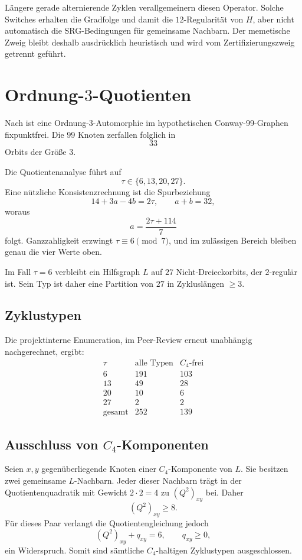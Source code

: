 \documentclass[11pt,a4paper]{article}
\begin{document}
Längere gerade alternierende Zyklen verallgemeinern diesen Operator. Solche Switches erhalten die Gradfolge und damit die $12$-Regularität von $H$, aber nicht automatisch die SRG-Bedingungen für gemeinsame Nachbarn. Der memetische Zweig bleibt deshalb ausdrücklich heuristisch und wird vom Zertifizierungszweig getrennt geführt.

\section{Ordnung-$3$-Quotienten}

Nach \cite{BehbahaniLam2011,CrnkovicMaksimovic2020} ist eine Ordnung-$3$-Automorphie im hypothetischen Conway-99-Graphen fixpunktfrei. Die $99$ Knoten zerfallen folglich in
\[
33
\]
Orbits der Größe $3$.

Die Quotientenanalyse führt auf
\[
\boxed{\tau\in\{6,13,20,27\}.}
\]
Eine nützliche Konsistenzrechnung ist die Spurbeziehung
\[
14+3a-4b=2\tau,\qquad a+b=32,
\]
woraus
\[
a=\frac{2\tau+114}{7}
\]
folgt. Ganzzahligkeit erzwingt $\tau\equiv6\pmod 7$, und im zulässigen Bereich bleiben genau die vier Werte oben.

Im Fall $\tau=6$ verbleibt ein Hilfsgraph $L$ auf $27$ Nicht-Dreieckorbits, der $2$-regulär ist. Sein Typ ist daher eine Partition von $27$ in Zykluslängen $\ge3$.

\subsection{Zyklustypen}

Die projektinterne Enumeration, im Peer-Review erneut unabhängig nachgerechnet, ergibt:
\[
\begin{array}{c|r|r}
\tau & \text{alle Typen} & \text{$C_4$-frei}\\
\hline
6  & 191 & 103\\
13 & 49  & 28\\
20 & 10  & 6\\
27 & 2   & 2\\
\hline
\text{gesamt} & 252 & 139
\end{array}
\]

\subsection{Ausschluss von $C_4$-Komponenten}

Seien $x,y$ gegenüberliegende Knoten einer $C_4$-Komponente von $L$. Sie besitzen zwei gemeinsame $L$-Nachbarn. Jeder dieser Nachbarn trägt in der Quotientenquadratik mit Gewicht $2\cdot2=4$ zu $(Q^2)_{xy}$ bei. Daher
\[
(Q^2)_{xy}\ge8.
\]
Für dieses Paar verlangt die Quotientengleichung jedoch
\[
(Q^2)_{xy}+q_{xy}=6,\qquad q_{xy}\ge0,
\]
ein Widerspruch. Somit sind sämtliche $C_4$-haltigen Zyklustypen ausgeschlossen.
\end{document}
